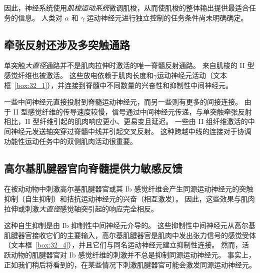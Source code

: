 因此，神经系统使用\textit{肌梭运动系统}微调肌梭，从而使肌梭的整体输出提供最适合任务的信息。
人类对 $ \alpha $ 和 $ \gamma $ 运动神经元进行独立控制的任务条件尚未明确确定。



\subsection{牵张反射还涉及多突触通路}

单突触\textit{大直径}通路并不是肌肉拉伸时激活的唯一脊髓反射通路。
来自肌梭的 II 型感觉纤维也被激活。
这些放电依赖于肌肉长度和$ \gamma $运动神经元活动（文本框~\ref{box:32_1}），并连接到脊髓中不同数量的兴奋性和抑制性中间神经元。


一些中间神经元直接投射到脊髓运动神经元，而另一些则有更多的间接连接。
由于 II 型感觉纤维的传导速度较慢，信号通过中间神经元传递，与单突触牵张反射相比，II 型纤维引起的肌肉响应更小、更易变且延迟。
一些由 II 组纤维激活的中间神经元发送轴突穿过脊髓中线并引起交叉反射。
这种跨越中线的连接对于协调功能性运动任务中的双侧肌肉活动很重要。



\subsection{高尔基肌腱器官向脊髓提供力敏感反馈}

在被动动物中刺激高尔基肌腱器官或其 Ib 感觉纤维会产生同源运动神经元的突触抑制（自生抑制）和拮抗运动神经元的兴奋（相互激发）。
因此，这些效果与肌肉拉伸或刺激\textit{大直径}感觉轴突引起的响应完全相反。


这种自生抑制是由 Ib 抑制性中间神经元介导的。
这些抑制性中间神经元从高尔基肌腱器官接收它们的主要输入，高尔基肌腱器官是肌肉中发出张力信号的感觉受体（文本框~\ref{box:32_4}），并且它们与同名运动神经元建立抑制性连接。
然而，活跃动物的肌腱器官对 Ib 感觉纤维的刺激并不总是抑制同源运动神经元。
事实上，正如我们稍后将看到的，在某些情况下刺激肌腱器官可能会激发同源运动神经元。


